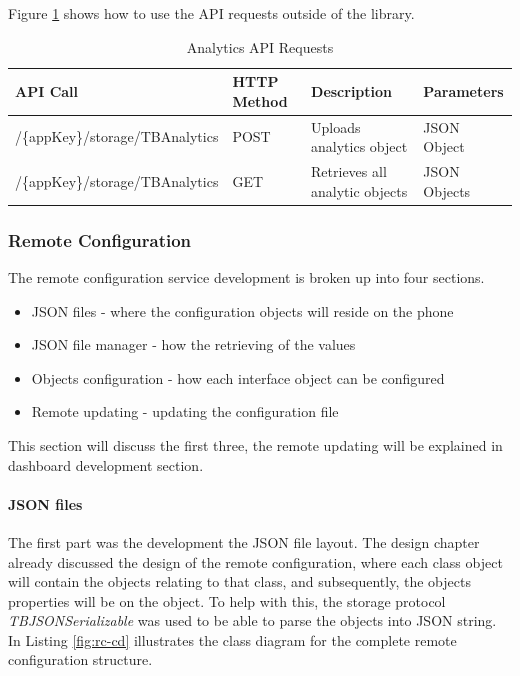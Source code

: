 Figure \ref{table:analytics} shows how to use the API requests outside of the library.

\begin{table}[!h]
\centering
\caption{Analytics API Requests}
\label{table:analytics}
\begin{tabular}{|l|l|l|l|}
\hline
\rowcolor{green!20}
API Call                        & HTTP Method & Description                    & Parameters   \\ \hline
/\{appKey\}/storage/TBAnalytics & POST        & Uploads analytics object       & JSON Object  \\ \hline
/\{appKey\}/storage/TBAnalytics & GET         & Retrieves all analytic objects & JSON Objects \\ \hline
\end{tabular}
\end{table}


\subsubsection{Remote Configuration} \label{dev:sub_rc}

The remote configuration service development is broken up into four sections.

\begin{itemize}
  \item JSON files 
  - where the configuration objects will reside on the phone
  \item JSON file manager
  - how the retrieving of the values
  \item Objects configuration
  - how each interface object can be configured
  \item Remote updating
  - updating the configuration file
\end{itemize}

This section will discuss the first three, the remote updating will be explained in dashboard development section.

\paragraph{JSON files}

The first part was the development the JSON file layout. The design chapter already discussed the design of the remote configuration, where each class object will contain the objects relating to that class, and subsequently, the objects properties will be on the object. To help with this, the storage protocol \textit{TBJSONSerializable} was used to be able to parse the objects into JSON string. In Listing \ref{fig:rc-cd} illustrates the class diagram for the complete remote configuration structure.

